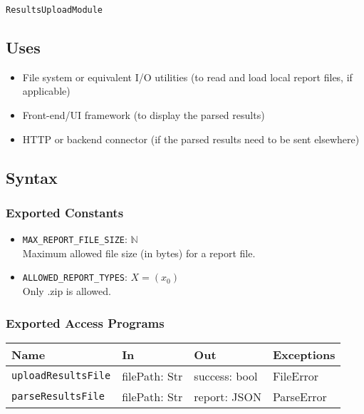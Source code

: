 \documentclass[12pt, titlepage]{article}
\begin{document}
\texttt{ResultsUploadModule}

\subsection{Uses}

\begin{itemize}
    \item File system or equivalent I/O utilities (to read and load local report files, if applicable)
    \item Front-end/UI framework (to display the parsed results)
    \item HTTP or backend connector (if the parsed results need to be sent elsewhere)
\end{itemize}

\subsection{Syntax}

\subsubsection{Exported Constants}

\begin{itemize}
    \item \texttt{MAX\_REPORT\_FILE\_SIZE}: $\mathbb{N}$ \\
     Maximum allowed file size (in bytes) for a report file.
    \item \texttt{ALLOWED\_REPORT\_TYPES}: $X = (x_0)$ \\
     Only .zip is allowed.
\end{itemize}

\subsubsection{Exported Access Programs}

\begin{center}
\begin{tabular}{p{5cm} p{3.5cm} p{3.5cm} p{2cm}}
\hline
\textbf{Name} & \textbf{In} & \textbf{Out} & \textbf{Exceptions} \\
\hline
\texttt{uploadResultsFile} & filePath: Str & success: bool & FileError \\
\texttt{parseResultsFile} & filePath: Str & report: JSON & ParseError \\
\hline
\end{tabular}
\end{center}
\end{document}
